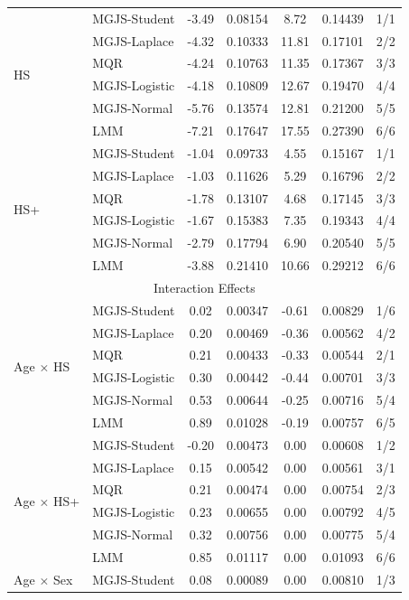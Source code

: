 \documentclass[twoside]{article}
\begin{document}
\begin{table}
\begin{tabular}{l l c c c c c}
		\multirow{6}{*}{HS} & MGJS-Student & -3.49 & 0.08154 & 8.72 & 0.14439 & 1/1 \\
		& MGJS-Laplace & -4.32 & 0.10333 & 11.81 & 0.17101 & 2/2 \\
		& MQR & -4.24 & 0.10763 & 11.35 & 0.17367 & 3/3 \\
		& MGJS-Logistic & -4.18 & 0.10809 & 12.67 & 0.19470 & 4/4 \\
		& MGJS-Normal & -5.76 & 0.13574 & 12.81 & 0.21200 & 5/5 \\
		& LMM & -7.21 & 0.17647 & 17.55 & 0.27390 & 6/6 \\
		\hline
		\multirow{6}{*}{HS+} & MGJS-Student & -1.04 & 0.09733 & 4.55 & 0.15167 & 1/1 \\
		& MGJS-Laplace & -1.03 & 0.11626 & 5.29 & 0.16796 & 2/2 \\
		& MQR & -1.78 & 0.13107 & 4.68 & 0.17145 & 3/3 \\
		& MGJS-Logistic & -1.67 & 0.15383 & 7.35 & 0.19343 & 4/4 \\
		& MGJS-Normal & -2.79 & 0.17794 & 6.90 & 0.20540 & 5/5 \\
		& LMM & -3.88 & 0.21410 & 10.66 & 0.29212 & 6/6 \\
		\hline
		\multicolumn{7}{c}{Interaction Effects} \\
		\hline
		\multirow{6}{*}{Age $\times$ HS} & MGJS-Student & 0.02 & 0.00347 & -0.61 & 0.00829 & 1/6 \\
		& MGJS-Laplace & 0.20 & 0.00469 & -0.36 & 0.00562 & 4/2 \\
		& MQR & 0.21 & 0.00433 & -0.33 & 0.00544 & 2/1 \\
		& MGJS-Logistic & 0.30 & 0.00442 & -0.44 & 0.00701 & 3/3 \\
		& MGJS-Normal & 0.53 & 0.00644 & -0.25 & 0.00716 & 5/4 \\
		& LMM & 0.89 & 0.01028 & -0.19 & 0.00757 & 6/5 \\
		\hline
		\multirow{6}{*}{Age $\times$ HS+} & MGJS-Student & -0.20 & 0.00473 & 0.00 & 0.00608 & 1/2 \\
		& MGJS-Laplace & 0.15 & 0.00542 & 0.00 & 0.00561 & 3/1 \\
		& MQR & 0.21 & 0.00474 & 0.00 & 0.00754 & 2/3 \\
		& MGJS-Logistic & 0.23 & 0.00655 & 0.00 & 0.00792 & 4/5 \\
		& MGJS-Normal & 0.32 & 0.00756 & 0.00 & 0.00775 & 5/4 \\
		& LMM & 0.85 & 0.01117 & 0.00 & 0.01093 & 6/6 \\
		\hline
		\multirow{6}{*}{Age $\times$ Sex} & MGJS-Student & 0.08 & 0.00089 & 0.00 & 0.00810 & 1/3 \\

\end{tabular}
\end{table}
\end{document}
